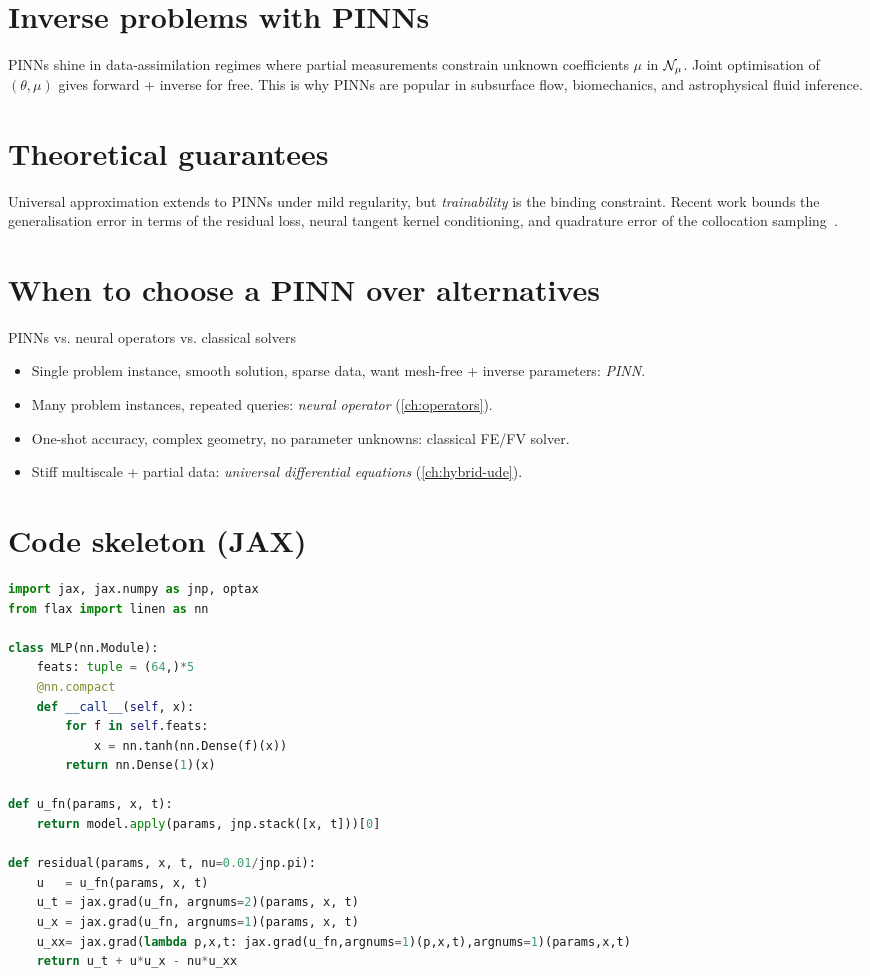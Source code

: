 \section{Inverse problems with PINNs}
PINNs shine in data-assimilation regimes where partial measurements
constrain unknown coefficients $\mu$ in $\mathcal{N}_\mu$. Joint optimisation
of $(\theta,\mu)$ gives forward + inverse for free. This is why PINNs
are popular in subsurface flow, biomechanics, and astrophysical fluid
inference.

\section{Theoretical guarantees}
Universal approximation extends to PINNs under mild regularity, but
\emph{trainability} is the binding constraint. Recent work bounds the
generalisation error in terms of the residual loss, neural tangent
kernel conditioning, and quadrature error of the collocation
sampling~\cite{wang2022ntkpinn,deryck2024pinns}.

\section{When to choose a PINN over alternatives}
\begin{insight}{PINNs vs. neural operators vs. classical solvers}
\begin{itemize}
\item Single problem instance, smooth solution, sparse data, want
mesh-free + inverse parameters: \emph{PINN}.
\item Many problem instances, repeated queries: \emph{neural operator}
(\cref{ch:operators}).
\item One-shot accuracy, complex geometry, no parameter unknowns:
classical FE/FV solver.
\item Stiff multiscale + partial data: \emph{universal differential
equations} (\cref{ch:hybrid-ude}).
\end{itemize}
\end{insight}

\section{Code skeleton (JAX)}
\begin{lstlisting}[language=Python,caption={Minimal PINN for 1D Burgers},label=lst:pinn]
import jax, jax.numpy as jnp, optax
from flax import linen as nn

class MLP(nn.Module):
    feats: tuple = (64,)*5
    @nn.compact
    def __call__(self, x):
        for f in self.feats:
            x = nn.tanh(nn.Dense(f)(x))
        return nn.Dense(1)(x)

def u_fn(params, x, t):
    return model.apply(params, jnp.stack([x, t]))[0]

def residual(params, x, t, nu=0.01/jnp.pi):
    u   = u_fn(params, x, t)
    u_t = jax.grad(u_fn, argnums=2)(params, x, t)
    u_x = jax.grad(u_fn, argnums=1)(params, x, t)
    u_xx= jax.grad(lambda p,x,t: jax.grad(u_fn,argnums=1)(p,x,t),argnums=1)(params,x,t)
    return u_t + u*u_x - nu*u_xx
\end{lstlisting}

